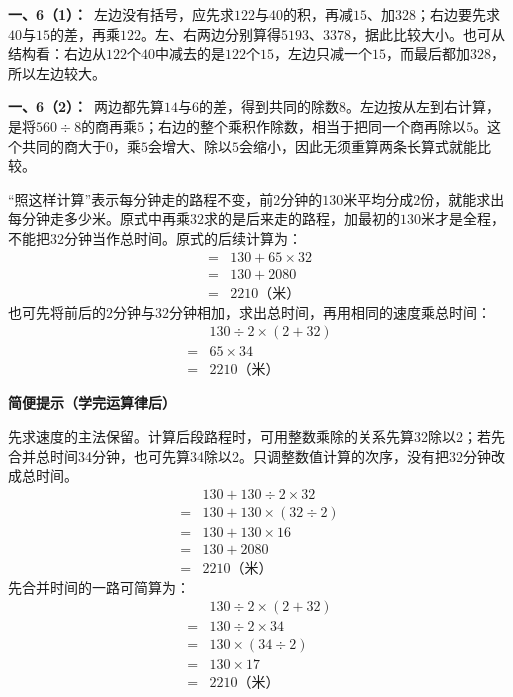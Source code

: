 \documentclass[multi=snippet,border=0pt]{standalone}
\newenvironment{snippet}[3]{\begin{minipage}{#1bp}\color{answerred}\fontsize{#2}{#3}\selectfont\raggedright}{\end{minipage}}
\begin{document}
\begin{snippet}{505}{11.5}{14}\textbf{一、6（1）：}\ 左边没有括号，应先求\(122\)与\(40\)的积，再减\(15\)、加\(328\)；右边要先求\(40\)与\(15\)的差，再乘\(122\)。左、右两边分别算得\(5193\)、\(3378\)，据此比较大小。也可从结构看：右边从\(122\)个\(40\)中减去的是\(122\)个\(15\)，左边只减一个\(15\)，而最后都加\(328\)，所以左边较大。\end{snippet}
\begin{snippet}{505}{11.5}{14}\textbf{一、6（2）：}\ 两边都先算\(14\)与\(6\)的差，得到共同的除数\(8\)。左边按从左到右计算，是将\(560\div8\)的商再乘\(5\)；右边的整个乘积作除数，相当于把同一个商再除以\(5\)。这个共同的商大于\(0\)，乘\(5\)会增大、除以\(5\)会缩小，因此无须重算两条长算式就能比较。\end{snippet}
\begin{snippet}{505}{11.5}{14}“照这样计算”表示每分钟走的路程不变，前\(2\)分钟的\(130\)米平均分成\(2\)份，就能求出每分钟走多少米。原式中再乘\(32\)求的是后来走的路程，加最初的\(130\)米才是全程，不能把\(32\)分钟当作总时间。原式的后续计算为：\[\begin{aligned}={}&130+65\times32\\={}&130+2080\\={}&2210\text{（米）}\end{aligned}\]也可先将前后的\(2\)分钟与\(32\)分钟相加，求出总时间，再用相同的速度乘总时间：\[\begin{aligned}&130\div2\times(2+32)\\={}&65\times34\\={}&2210\text{（米）}\end{aligned}\]\par\textbf{简便提示（学完运算律后）}\par 先求速度的主法保留。计算后段路程时，可用整数乘除的关系先算32除以2；若先合并总时间34分钟，也可先算34除以2。只调整数值计算的次序，没有把32分钟改成总时间。\[\begin{aligned}&130+130\div2\times32\\={}&130+130\times(32\div2)\\={}&130+130\times16\\={}&130+2080\\={}&2210\text{（米）}\end{aligned}\]先合并时间的一路可简算为：\[\begin{aligned}&130\div2\times(2+32)\\={}&130\div2\times34\\={}&130\times(34\div2)\\={}&130\times17\\={}&2210\text{（米）}\end{aligned}\]\end{snippet}
\end{document}
